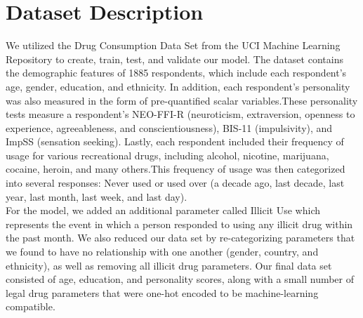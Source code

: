 \section{Dataset Description}

We utilized the Drug Consumption Data Set from the UCI Machine Learning Repository\cite{drug-data} to create, train, test, and validate our model. The dataset contains the demographic features of 1885 respondents, which include each respondent’s age, gender, education, and ethnicity. In addition, each respondent’s personality was also measured in the form of pre-quantified scalar variables.\hspace{1pt}These personality tests measure a respondent’s NEO-FFI-R (neuroticism, extraversion, openness to experience, agreeableness, and conscientiousness), BIS-11 (impulsivity), and ImpSS (sensation seeking). Lastly, each respondent included their frequency of usage for various recreational drugs, including alcohol, nicotine, marijuana, cocaine, heroin, and many others.\hspace{1pt}This frequency of usage was then categorized into several responses: Never used or used over (a decade ago, last decade, last year, last month, last week, and last day).\\

For the model, we added an additional parameter called Illicit Use which represents the event in which a person responded to using any illicit drug within the past month. We also reduced our data set by re-categorizing parameters that we found to have no relationship with one another (gender, country, and ethnicity), as well as removing all illicit drug parameters. Our final data set consisted of age, education, and personality scores, along with a small number of legal drug parameters that were one-hot encoded to be machine-learning compatible.

\raggedbottom